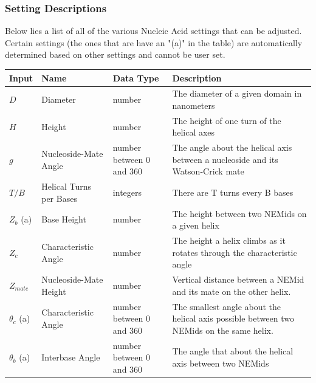 \documentclass[
titlepage,
fontsize=12pt
]{article}
\begin{document}
	\subsubsection{Setting Descriptions}
	Below lies a list of all of the various Nucleic Acid settings that can be adjusted. Certain settings (the ones that are have an "(a)" in the table) are automatically determined based on other settings and cannot be user set. \linebreak
	
	\begin{center}
	\begin{tabular}{|p{.5in}|p{.7in}|p{1in}|p{3in}|}
		\label{tab:setting-descriptions}
		Input & Name & Data Type & Description \\ \hline
		
		$D$ & Diameter & number & The diameter of a given domain in nanometers \\ \hline
		
		$H$ & Height & number & The height of one turn of the helical axes \\ \hline
		
		$g$ & Nucleoside-Mate Angle & number between 0 and 360 & The angle about the helical axis between a nucleoside and its Watson-Crick mate \\ \hline
		
		$T/B$ & Helical Turns per Bases & integers & There are T turns every B bases \\ \hline
		
		$Z_b$ (a) & Base Height & number & The height between two NEMids on a given helix \\ \hline
		
		$Z_c$ & Characteristic Angle & number & The height a helix climbs as it rotates through the characteristic angle \\ \hline
		
		$Z_{mate}$ & Nucleoside-Mate Height & number & Vertical distance between a NEMid and its mate on the other helix. \\ \hline
		
		$\theta_{c}$ (a) & Characteristic Angle & number between 0 and 360 & The smallest angle about the helical axis possible between two NEMids on the same helix. \\ \hline
	
		$\theta_{b}$ (a) & Interbase Angle & number between 0 and 360 & The angle that about the helical axis between two NEMids \\
	\end{tabular}
	\end{center}
	
\end{document}
